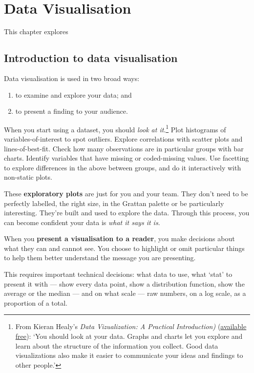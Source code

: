 \documentclass[]{book}
\providecommand{\tightlist}{%
  \setlength{\itemsep}{0pt}\setlength{\parskip}{0pt}}
\let\rmarkdownfootnote\footnote%
\def\footnote{\protect\rmarkdownfootnote}
\begin{document}
\hypertarget{data-visualisation}{%
\chapter{Data Visualisation}\label{data-visualisation}}

This chapter explores

\hypertarget{introduction-to-data-visualisation}{%
\section{Introduction to data visualisation}\label{introduction-to-data-visualisation}}

Data visualisation is used in two broad ways:

\begin{enumerate}
\def\labelenumi{\arabic{enumi}.}
\tightlist
\item
  to examine and explore your data; and
\item
  to present a finding to your audience.
\end{enumerate}

When you start using a dataset, you should \emph{look at it}.\footnote{From Kieran Healy's \emph{Data Vizualization: A Practical Introduction)} (\href{https://socviz.co/}{available free}): `You should look at your data. Graphs and charts let you explore and learn about the structure of the information you collect. Good data visualizations also make it easier to communicate your ideas and findings to other people.'} Plot histograms of variables-of-interest to spot outliers. Explore correlations with scatter plots and lines-of-best-fit. Check how many observations are in particular groups with bar charts. Identify variables that have missing or coded-missing values. Use facetting to explore differences in the above between groups, and do it interactively with non-static plots.

These \textbf{exploratory plots} are just for you and your team. They don't need to be perfectly labelled, the right size, in the Grattan palette or be particularly interesting.
They're built and used to explore the data.
Through this process, you can become confident your data is \emph{what it says it is}.

When you \textbf{present a visualisation to a reader}, you make decisions about what they can and cannot see. You choose to highlight or omit particular things to help them better understand the message you are presenting.

This requires important technical decisions: what data to use, what `stat' to present it with --- show every data point, show a distribution function, show the average or the median --- and on what scale --- raw numbers, on a log scale, as a proportion of a total.
\end{document}
